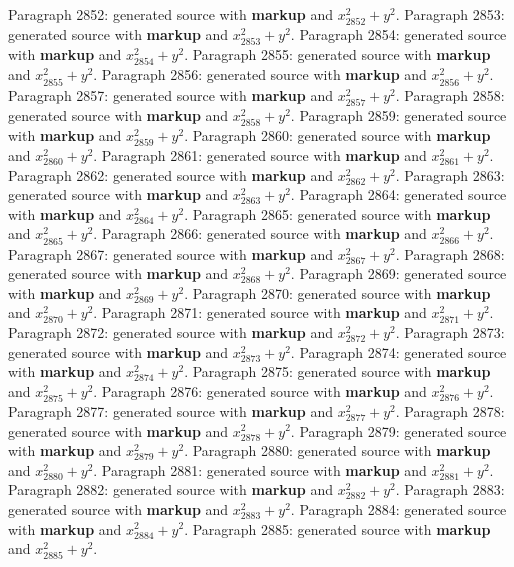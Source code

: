\documentclass{article}
\begin{document}
Paragraph 2852: generated source with \textbf{markup} and $x_{2852}^2 + y^2$.
Paragraph 2853: generated source with \textbf{markup} and $x_{2853}^2 + y^2$.
Paragraph 2854: generated source with \textbf{markup} and $x_{2854}^2 + y^2$.
Paragraph 2855: generated source with \textbf{markup} and $x_{2855}^2 + y^2$.
Paragraph 2856: generated source with \textbf{markup} and $x_{2856}^2 + y^2$.
Paragraph 2857: generated source with \textbf{markup} and $x_{2857}^2 + y^2$.
Paragraph 2858: generated source with \textbf{markup} and $x_{2858}^2 + y^2$.
Paragraph 2859: generated source with \textbf{markup} and $x_{2859}^2 + y^2$.
Paragraph 2860: generated source with \textbf{markup} and $x_{2860}^2 + y^2$.
Paragraph 2861: generated source with \textbf{markup} and $x_{2861}^2 + y^2$.
Paragraph 2862: generated source with \textbf{markup} and $x_{2862}^2 + y^2$.
Paragraph 2863: generated source with \textbf{markup} and $x_{2863}^2 + y^2$.
Paragraph 2864: generated source with \textbf{markup} and $x_{2864}^2 + y^2$.
Paragraph 2865: generated source with \textbf{markup} and $x_{2865}^2 + y^2$.
Paragraph 2866: generated source with \textbf{markup} and $x_{2866}^2 + y^2$.
Paragraph 2867: generated source with \textbf{markup} and $x_{2867}^2 + y^2$.
Paragraph 2868: generated source with \textbf{markup} and $x_{2868}^2 + y^2$.
Paragraph 2869: generated source with \textbf{markup} and $x_{2869}^2 + y^2$.
Paragraph 2870: generated source with \textbf{markup} and $x_{2870}^2 + y^2$.
Paragraph 2871: generated source with \textbf{markup} and $x_{2871}^2 + y^2$.
Paragraph 2872: generated source with \textbf{markup} and $x_{2872}^2 + y^2$.
Paragraph 2873: generated source with \textbf{markup} and $x_{2873}^2 + y^2$.
Paragraph 2874: generated source with \textbf{markup} and $x_{2874}^2 + y^2$.
Paragraph 2875: generated source with \textbf{markup} and $x_{2875}^2 + y^2$.
Paragraph 2876: generated source with \textbf{markup} and $x_{2876}^2 + y^2$.
Paragraph 2877: generated source with \textbf{markup} and $x_{2877}^2 + y^2$.
Paragraph 2878: generated source with \textbf{markup} and $x_{2878}^2 + y^2$.
Paragraph 2879: generated source with \textbf{markup} and $x_{2879}^2 + y^2$.
Paragraph 2880: generated source with \textbf{markup} and $x_{2880}^2 + y^2$.
Paragraph 2881: generated source with \textbf{markup} and $x_{2881}^2 + y^2$.
Paragraph 2882: generated source with \textbf{markup} and $x_{2882}^2 + y^2$.
Paragraph 2883: generated source with \textbf{markup} and $x_{2883}^2 + y^2$.
Paragraph 2884: generated source with \textbf{markup} and $x_{2884}^2 + y^2$.
Paragraph 2885: generated source with \textbf{markup} and $x_{2885}^2 + y^2$.
\end{document}

